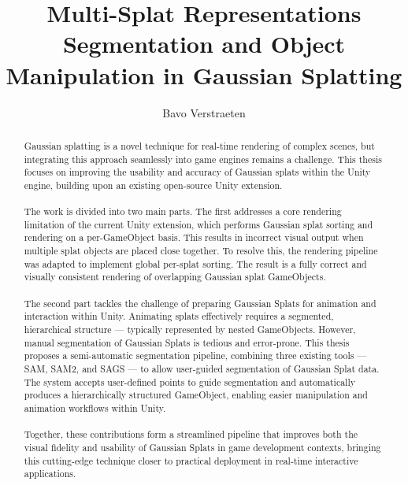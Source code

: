 \documentclass[12pt]{article}
\begin{document}
\begin{titlepage}
	\centering
	
	\title{Multi-Splat Representations \\ {\large Segmentation and Object Manipulation in Gaussian Splatting}}
	
	\author{Bavo Verstraeten}
	
	
	
	\maketitle
\end{titlepage}
	
\begin{abstract}
Gaussian splatting is a novel technique for real-time rendering of complex scenes, but integrating this approach seamlessly into game engines remains a challenge. This thesis focuses on improving the usability and accuracy of Gaussian splats within the Unity engine, building upon an existing open-source Unity extension.
\\\\
The work is divided into two main parts. The first addresses a core rendering limitation of the current Unity extension, which performs Gaussian splat sorting and rendering on a per-GameObject basis. This results in incorrect visual output when multiple splat objects are placed close together. To resolve this, the rendering pipeline was adapted to implement global per-splat sorting. The result is a fully correct and visually consistent rendering of overlapping Gaussian splat GameObjects.
\\\\
The second part tackles the challenge of preparing Gaussian Splats for animation and interaction within Unity. Animating splats effectively requires a segmented, hierarchical structure — typically represented by nested GameObjects. However, manual segmentation of Gaussian Splats is tedious and error-prone. This thesis proposes a semi-automatic segmentation pipeline, combining three existing tools — SAM, SAM2, and SAGS — to allow user-guided segmentation of Gaussian Splat data. The system accepts user-defined points to guide segmentation and automatically produces a hierarchically structured GameObject, enabling easier manipulation and animation workflows within Unity.
\\\\
Together, these contributions form a streamlined pipeline that improves both the visual fidelity and usability of Gaussian Splats in game development contexts, bringing this cutting-edge technique closer to practical deployment in real-time interactive applications.
\end{abstract}
\end{document}
